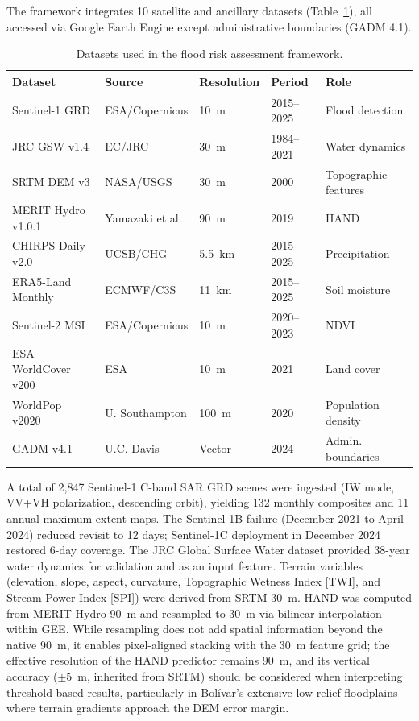 \documentclass{article}
\begin{document}
The framework integrates 10 satellite and ancillary datasets (Table~\ref{tab:data_sources}), all accessed via Google Earth Engine \citep{Gorelick2017} except administrative boundaries (GADM 4.1).

\begin{table}[htbp]
\caption{Datasets used in the flood risk assessment framework.}
\label{tab:data_sources}
\centering
\footnotesize
\begin{tabular}{lllll}
\toprule
\textbf{Dataset} & \textbf{Source} & \textbf{Resolution} & \textbf{Period} & \textbf{Role} \\
\midrule
Sentinel-1 GRD & ESA/Copernicus & \SI{10}{\metre} & 2015--2025 & Flood detection \\
JRC GSW v1.4 & EC/JRC & \SI{30}{\metre} & 1984--2021 & Water dynamics \\
SRTM DEM v3 & NASA/USGS & \SI{30}{\metre} & 2000 & Topographic features \\
MERIT Hydro v1.0.1 & Yamazaki et al. & \SI{90}{\metre} & 2019 & HAND \\
CHIRPS Daily v2.0 & UCSB/CHG & \SI{5.5}{\kilo\metre} & 2015--2025 & Precipitation \\
ERA5-Land Monthly & ECMWF/C3S & \SI{11}{\kilo\metre} & 2015--2025 & Soil moisture \\
Sentinel-2 MSI & ESA/Copernicus & \SI{10}{\metre} & 2020--2023 & NDVI \\
ESA WorldCover v200 & ESA & \SI{10}{\metre} & 2021 & Land cover \\
WorldPop v2020 & U. Southampton & \SI{100}{\metre} & 2020 & Population density \\
GADM v4.1 & U.C. Davis & Vector & 2024 & Admin. boundaries \\
\bottomrule
\end{tabular}
\end{table}

A total of 2,847 Sentinel-1 C-band SAR GRD scenes were ingested (IW mode, VV+VH polarization, descending orbit), yielding 132 monthly composites and 11 annual maximum extent maps. The Sentinel-1B failure (December 2021 to April 2024) reduced revisit to 12 days; Sentinel-1C deployment in December 2024 restored 6-day coverage. The JRC Global Surface Water dataset \citep{Pekel2016} provided 38-year water dynamics for validation and as an input feature. Terrain variables (elevation, slope, aspect, curvature, Topographic Wetness Index [TWI], and Stream Power Index [SPI]) were derived from SRTM \SI{30}{\metre}. HAND was computed from MERIT Hydro \SI{90}{\metre} \citep{Yamazaki2019} and resampled to \SI{30}{\metre} via bilinear interpolation within GEE. While resampling does not add spatial information beyond the native \SI{90}{\metre}, it enables pixel-aligned stacking with the \SI{30}{\metre} feature grid; the effective resolution of the HAND predictor remains \SI{90}{\metre}, and its vertical accuracy ($\pm$\SI{5}{\metre}, inherited from SRTM) should be considered when interpreting threshold-based results, particularly in Bol\'ivar's extensive low-relief floodplains where terrain gradients approach the DEM error margin.
\end{document}
